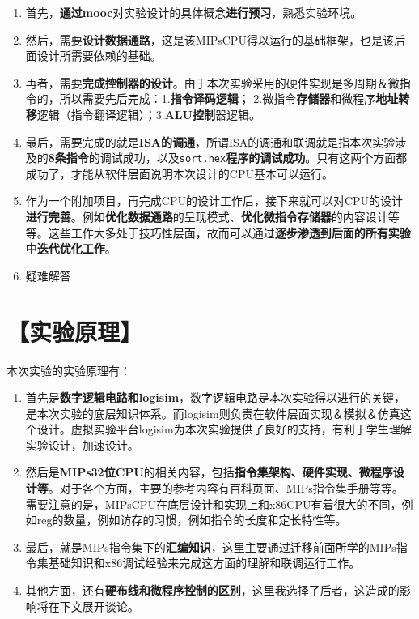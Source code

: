 \documentclass[withoutpreface]{cumcmthesis} %
\begin{document}
\begin{enumerate}
\item 首先，\textbf{通过mooc}对实验设计的具体概念\textbf{进行预习}，熟悉实验环境。
\item 然后，需要\textbf{设计数据通路}，这是该MIPsCPU得以运行的基础框架，也是该后面设计所需要依赖的基础。
\item 再者，需要\textbf{完成控制器的设计}。由于本次实验采用的硬件实现是多周期＆微指令的，所以需要先后完成：1.\textbf{指令译码逻辑}； 2.微指令\textbf{存储器}和微程序\textbf{地址转移}逻辑（指令翻译逻辑）；3.\textbf{ALU控制}器逻辑。
\item 最后，需要完成的就是\textbf{ISA的调通}，所谓ISA的调通和联调就是指本次实验涉及的\textbf{8条指令}的调试成功，以及\verb+sort.hex+\textbf{程序的调试成功}。只有这两个方面都成功了，才能从软件层面说明本次设计的CPU基本可以运行。
\item 作为一个附加项目，再完成CPU的设计工作后，接下来就可以对CPU的设计\textbf{进行完善}。例如\textbf{优化数据通路}的呈现模式、\textbf{优化微指令存储器}的内容设计等等。这些工作大多处于技巧性层面，故而可以通过\textbf{逐步渗透到后面的所有实验中迭代优化工作}。
\item 疑难解答
\end{enumerate}


\section{【实验原理】}
本次实验的实验原理有：

\begin{enumerate}
	\item 首先是\textbf{数字逻辑电路和logisim}，数字逻辑电路是本次实验得以进行的关键，是本次实验的底层知识体系。而logisim则负责在软件层面实现＆模拟＆仿真这个设计。虚拟实验平台logisim为本次实验提供了良好的支持，有利于学生理解实验设计，加速设计。
	\item 然后是\textbf{MIPs32位CPU}的相关内容，包括\textbf{指令集架构、硬件实现、微程序设计等}。对于各个方面，主要的参考内容有百科页面、MIPs指令集手册等等。需要注意的是，MIPsCPU在底层设计和实现上和x86CPU有着很大的不同，例如reg的数量，例如访存的习惯，例如指令的长度和定长特性等。
	\item 最后，就是MIPs指令集下的\textbf{汇编知识}，这里主要通过迁移前面所学的MIPs指令集基础知识和x86调试经验来完成这方面的理解和联调运行工作。
	\item 其他方面，还有\textbf{硬布线和微程序控制的区别}，这里我选择了后者，这造成的影响将在下文展开谈论。
\end{enumerate}
\end{document}
